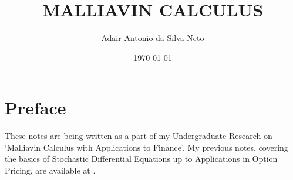 \documentclass[12pt,a4paper,twoside]{report}
\author{\sffamily \href{https://github.com/adairneto}{Adair Antonio da Silva Neto}}
\title{\sffamily \uppercase{Malliavin Calculus}}
\date{\sffamily \today}
\begin{document}
\maketitle
\tableofcontents
\thispagestyle{empty}
\setcounter{page}{1}


\chapter*{Preface}

These notes are being written as a part of my Undergraduate Research on `Malliavin Calculus with Applications to Finance'. My previous notes, covering the basics of Stochastic Differential Equations up to Applications in Option Pricing, are available at \cite{Silva23stochastic}.











\end{document}
